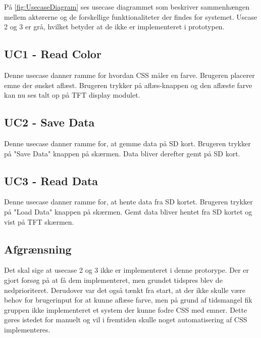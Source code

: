 På \autoref{fig:UsecaseDiagram} ses usecase diagrammet som beskriver sammenhængen mellem aktørerne og de forskellige funktionaliteter der findes for systemet. Uscase 2 og 3 er grå, hvilket betyder at de ikke er implementeret i prototypen. 

\subsection{UC1 - Read Color}
Denne usecase danner ramme for hvordan CSS måler en farve. Brugeren placerer emne der ønsket aflæst. Brugeren trykker på aflæs-knappen og den aflæste farve kan nu ses talt op på TFT display modulet.

\subsection{UC2 - Save Data}
Denne usecase danner ramme for, at gemme data på SD kort. Brugeren trykker på "Save Data" knappen på skærmen. Data bliver derefter gemt på SD kort.

\subsection{UC3 - Read Data}
Denne usecase danner ramme for, at hente data fra SD kortet. Brugeren trykker på "Load Data" knappen på skærmen. Gemt data bliver hentet fra SD kortet og vist på TFT skærmen.

\subsection{Afgrænsning}
Det skal sige at usecase 2 og 3 ikke er implementeret i denne protorype. Der er gjort forsøg på at få dem implementeret, men grundet tidspres blev de nedprioriteret. Derudover var det også tænkt fra start, at der ikke skulle være behov for brugerinput for at kunne aflæse farve, men på grund af tidsmangel fik gruppen ikke implementeret et system der kunne fodre CSS med emner. Dette gøres istedet for manuelt og vil i fremtiden skulle noget automatisering af CSS implementeres.

